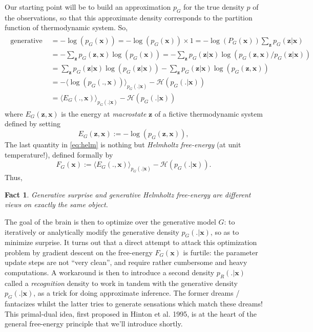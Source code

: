 \documentclass{article} %
\newtheorem{fact}[thm]{Fact}
\def\z{\mathbf{z}}
\def\x{\mathbf{x}}
\begin{document}
Our starting point will be to build an approximation $p_G$ for the true density $p$ of the observations, so that this approximate density corresponds to the partition function of thermodynamic system. So,
\begin{eqnarray}
  \begin{split}
    \text{generative surprise } &= -\log(p_G(\x)) = -\log(p_G(\x)) \times 1 = -\log(P_G(\x))\sum_{\z}p_G(\z |\x)\\
    &= -\sum_{\z}p_G(\z, \x)\log(p_G(\x))
    =-\sum_{\z}p_G(\z |\x)\log(p_G(\z, \x)/p_G(\z|\x))\\
    &= \sum_{\z}p_G(\z |\x)\log(p_G(\z|\x))-\sum_{\z}p_G(\z |\x)\log  (p_G(\z, \x))\\
    &= -\langle \log  (p_G(., \x)) \rangle_{p_G(. |\x)} - \mathcal H(p_G(. |\x))\\
    &= \langle E_G(., \x) \rangle_{p_G(. |\x)} - \mathcal H(p_G(. |\x))
  \end{split}
  \label{eq:helm}
\end{eqnarray}
where $E_G(\z, \x)$ is the energy at \textit{macrostate} $\z$ of a fictive thermodynamic system defined by setting
\begin{equation}
  E_G(\z, \x) := -\log(p_G(\z, \x)),
  \label{eq:gibbs}
\end{equation}
The last quantity in \eqref{eq:helm} is nothing but \textit{Helmholtz free-energy} (at unit temperature!), defined formally by
\begin{equation}
  F_G(\x) := \langle E_G(., \x) \rangle_{p_G(. |\x)} - \mathcal H(p_G(. |\x)).
\end{equation}
Thus,
\begin{fact}
  Generative surprise and generative Helmholtz free-energy are different views on exactly the same object.
\end{fact}

The goal of the brain is then to optimize over the generative model $G$: to iteratively or analytically modify the generative density $p_G(.|\x)$, so as to minimize surprise. It turns out that a direct attempt to attack this optimization problem by gradient descent on the free-energy $F_G(\x)$ is furtile: the parameter update steps are not ``very clean'', and require rather cumbersome and heavy computations. A workaround is then to introduce a second density $p_R(.|\x)$ called a \textit{recognition} density to work in tandem with the generative density $p_G(.|\x)$, as a trick for doing approximate inference. The former dreams / fantacizes whilst the latter tries to generate sensations which match these dreams! This primal-dual idea, first proposed in Hinton et al. 1995, is at the heart of the general free-energy principle that we'll introduce shortly.
\end{document}
